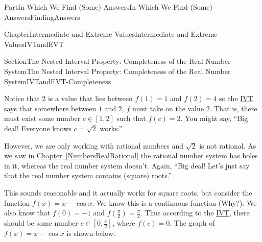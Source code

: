 \documentclass[oneside,10pt,]{book}
\newcommand{\xreffont}{\relax}
\numberwithin{equation}{part}
\begin{document}
\begin{partptx}{Part}{In Which We Find (Some) Answers}{}{In Which We Find (Some) Answers}{}{}{FindingAnswers}
\begin{chapterptx}{Chapter}{Intermediate and Extreme Values}{}{Intermediate and Extreme Values}{}{}{IVTandEVT}
\begin{sectionptx}{Section}{The Nested Interval Property: Completeness of the Real Number System}{}{The Nested Interval Property: Completeness of the Real Number System}{}{}{IVTandEVT-Completeness}
\begin{image}{0.315}{0.37}{0.315}{}
\end{image}%
Notice that \(2\) is a value that lies between \(f(1)=1\) and \(f(2)=4\) so the \hyperref[IntermediateValueTheorem]{IVT} says that somewhere between \(1\) and \(2\), \(f\) must take on the value \(2\).  That is, there must exist some number \(c\in[1,2]\) such that \(f(c)=2\).  You might say, ``Big deal!  Everyone knows \(c=\sqrt{2}\) works.''%
\par
However, we are only working with rational numbers and \(\sqrt{2}\) \(\)is not rational.  As we saw in \hyperref[NumbersRealRational]{Chapter~{\xreffont\ref{NumbersRealRational}}} the rational number system has holes in it, whereas the real number system doesn't. Again, ``Big deal!  Let's just say that the real number system contains (square) roots.''%
\par
This sounds reasonable and it actually works for square roots, but consider the function \(f(x)=x-\cos x\).  We know this is a continuous function (Why?).  We also know that \(f(0)=-1\) and \(f(\frac{\pi}{2})=\frac{\pi}{2}\).  Thus according to the \hyperref[IntermediateValueTheorem]{IVT}, there should be some number \(c\in[0,\frac{\pi}{2}]\), where \(f(c)=0\).  The graph of \(f(x)=x-\cos x\) is shown below.%
\begin{image}{0.315}{0.37}{0.315}{}%

\end{image}
\end{sectionptx}
\end{chapterptx}
\end{partptx}
\end{document}
